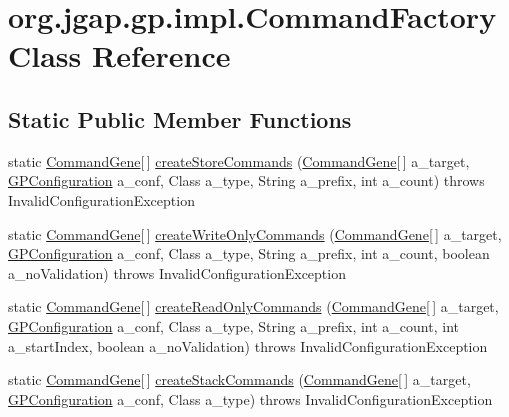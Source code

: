 \hypertarget{classorg_1_1jgap_1_1gp_1_1impl_1_1_command_factory}{\section{org.\-jgap.\-gp.\-impl.\-Command\-Factory Class Reference}
\label{classorg_1_1jgap_1_1gp_1_1impl_1_1_command_factory}
}
\subsection*{Static Public Member Functions}
\begin{DoxyCompactItemize}
\item 
static \hyperlink{classorg_1_1jgap_1_1gp_1_1_command_gene}{Command\-Gene}\mbox{[}$\,$\mbox{]} \hyperlink{classorg_1_1jgap_1_1gp_1_1impl_1_1_command_factory_a7def106ec48870af803918a2860da5bc}{create\-Store\-Commands} (\hyperlink{classorg_1_1jgap_1_1gp_1_1_command_gene}{Command\-Gene}\mbox{[}$\,$\mbox{]} a\-\_\-target, \hyperlink{classorg_1_1jgap_1_1gp_1_1impl_1_1_g_p_configuration}{G\-P\-Configuration} a\-\_\-conf, Class a\-\_\-type, String a\-\_\-prefix, int a\-\_\-count)  throws Invalid\-Configuration\-Exception 
\item 
static \hyperlink{classorg_1_1jgap_1_1gp_1_1_command_gene}{Command\-Gene}\mbox{[}$\,$\mbox{]} \hyperlink{classorg_1_1jgap_1_1gp_1_1impl_1_1_command_factory_a2ccd8570f7a5351ba0db9217d728f7e0}{create\-Write\-Only\-Commands} (\hyperlink{classorg_1_1jgap_1_1gp_1_1_command_gene}{Command\-Gene}\mbox{[}$\,$\mbox{]} a\-\_\-target, \hyperlink{classorg_1_1jgap_1_1gp_1_1impl_1_1_g_p_configuration}{G\-P\-Configuration} a\-\_\-conf, Class a\-\_\-type, String a\-\_\-prefix, int a\-\_\-count, boolean a\-\_\-no\-Validation)  throws Invalid\-Configuration\-Exception 
\item 
static \hyperlink{classorg_1_1jgap_1_1gp_1_1_command_gene}{Command\-Gene}\mbox{[}$\,$\mbox{]} \hyperlink{classorg_1_1jgap_1_1gp_1_1impl_1_1_command_factory_a5608719a4fc2d8daeb5ae9f56dd4cd00}{create\-Read\-Only\-Commands} (\hyperlink{classorg_1_1jgap_1_1gp_1_1_command_gene}{Command\-Gene}\mbox{[}$\,$\mbox{]} a\-\_\-target, \hyperlink{classorg_1_1jgap_1_1gp_1_1impl_1_1_g_p_configuration}{G\-P\-Configuration} a\-\_\-conf, Class a\-\_\-type, String a\-\_\-prefix, int a\-\_\-count, int a\-\_\-start\-Index, boolean a\-\_\-no\-Validation)  throws Invalid\-Configuration\-Exception 
\item 
static \hyperlink{classorg_1_1jgap_1_1gp_1_1_command_gene}{Command\-Gene}\mbox{[}$\,$\mbox{]} \hyperlink{classorg_1_1jgap_1_1gp_1_1impl_1_1_command_factory_a3983da01b9cc6fdc92839328e8061849}{create\-Stack\-Commands} (\hyperlink{classorg_1_1jgap_1_1gp_1_1_command_gene}{Command\-Gene}\mbox{[}$\,$\mbox{]} a\-\_\-target, \hyperlink{classorg_1_1jgap_1_1gp_1_1impl_1_1_g_p_configuration}{G\-P\-Configuration} a\-\_\-conf, Class a\-\_\-type)  throws Invalid\-Configuration\-Exception 
\end{DoxyCompactItemize}
